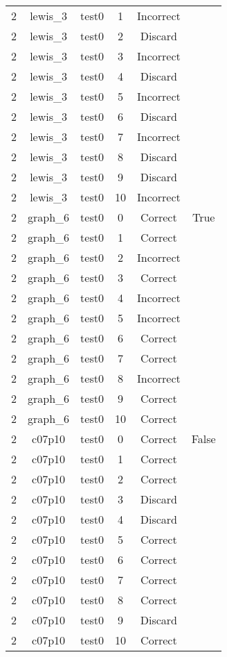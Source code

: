 \begin{longtable}{|c|c|c|c|c|c|}
2 & lewis\_3 & test0 & 1 & Incorrect &  \\ 
2 & lewis\_3 & test0 & 2 & Discard &  \\ 
2 & lewis\_3 & test0 & 3 & Incorrect &  \\ 
2 & lewis\_3 & test0 & 4 & Discard &  \\ 
2 & lewis\_3 & test0 & 5 & Incorrect &  \\ 
2 & lewis\_3 & test0 & 6 & Discard &  \\ 
2 & lewis\_3 & test0 & 7 & Incorrect &  \\ 
2 & lewis\_3 & test0 & 8 & Discard &  \\ 
2 & lewis\_3 & test0 & 9 & Discard &  \\ 
2 & lewis\_3 & test0 & 10 & Incorrect &  \\ 
2 & graph\_6 & test0 & 0 & Correct & True \\ 
2 & graph\_6 & test0 & 1 & Correct &  \\ 
2 & graph\_6 & test0 & 2 & Incorrect &  \\ 
2 & graph\_6 & test0 & 3 & Correct &  \\ 
2 & graph\_6 & test0 & 4 & Incorrect &  \\ 
2 & graph\_6 & test0 & 5 & Incorrect &  \\ 
2 & graph\_6 & test0 & 6 & Correct &  \\ 
2 & graph\_6 & test0 & 7 & Correct &  \\ 
2 & graph\_6 & test0 & 8 & Incorrect &  \\ 
2 & graph\_6 & test0 & 9 & Correct &  \\ 
2 & graph\_6 & test0 & 10 & Correct &  \\ 
2 & c07p10 & test0 & 0 & Correct & False \\ 
2 & c07p10 & test0 & 1 & Correct &  \\ 
2 & c07p10 & test0 & 2 & Correct &  \\ 
2 & c07p10 & test0 & 3 & Discard &  \\ 
2 & c07p10 & test0 & 4 & Discard &  \\ 
2 & c07p10 & test0 & 5 & Correct &  \\ 
2 & c07p10 & test0 & 6 & Correct &  \\ 
2 & c07p10 & test0 & 7 & Correct &  \\ 
2 & c07p10 & test0 & 8 & Correct &  \\ 
2 & c07p10 & test0 & 9 & Discard &  \\ 
2 & c07p10 & test0 & 10 & Correct &  \\ 

\end{longtable}
